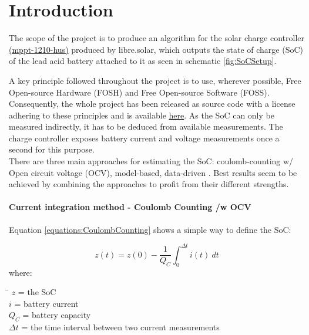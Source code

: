 


\chapter{Introduction}
\label{chap:Introduction}

The scope of the project is to produce an algorithm for the solar charge controller \href{https://github.com/LibreSolar/mppt-1210-hus}{(mppt-1210-hus)} produced by libre.solar, which outputs the state of charge (SoC) of the lead acid battery attached to it as seen in schematic \ref{fig:SoCSetup}.

A key principle followed throughout the project is to use, wherever possible, Free Open-source Hardware (FOSH) and Free Open-source Software (FOSS). Consequently, the whole project has been
released as source code  \cite{Schons_Development_and_validation_2021} with a license adhering to these principles and is available \href{https://github.com/mulles/Doc_Projekt-Labor_SOC}{here}. As the SoC can only be measured indirectly, it has to be deduced from available measurements.  %
The charge controller exposes battery current and voltage measurements once a second for this purpose. \\%
There are three main approaches for estimating the SoC: coulomb-counting w/ Open circuit voltage (OCV), model-based, data-driven \cite{espedal2021current}. Best results seem to be achieved by combining the approaches to profit from their different strengths.


\subsubsection{Current integration method - Coulomb Counting /w OCV}
\label{section:CoulombCounting}

Equation \ref{equations:CoulombCounting} shows a simple way to define the SoC:

\begin{equation}
z(t) = z(0) - \frac{1}{{Q_{C}}}\int_{0}^{\Delta t} {i(t)\ dt}
\label{equations:CoulombCounting}
\end{equation}
where: 
\begin{tabbing}
\phantom{$v(t)  \  \ \ \ $}\= \kill
$z  $\> = the SoC  \\
$i  $\> = battery current  \\
$Q_{C}$\> =  battery capacity   \\
$\Delta t$\> = the time interval between two current measurements
\end{tabbing}


